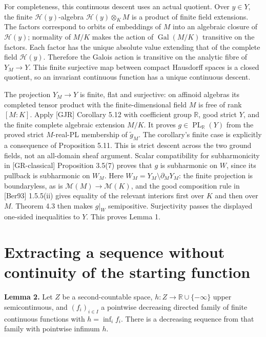 \documentclass[
  11pt,
]{article}
\begin{document}
For completeness, this continuous descent uses an actual quotient. Over
\(y\in Y\), the finite \(\mathcal H(y)\)-algebra
\(\mathcal H(y)\otimes_KM\) is a product of finite field extensions. The
factors correspond to orbits of embeddings of \(M\) into an algebraic
closure of \(\mathcal H(y)\); normality of \(M/K\) makes the action of
\(\operatorname{Gal}(M/K)\) transitive on the factors. Each factor has
the unique absolute value extending that of the complete field
\(\mathcal H(y)\). Therefore the Galois action is transitive on the
analytic fibre of \(Y_M\to Y\). This finite surjective map between
compact Hausdorff spaces is a closed quotient, so an invariant
continuous function has a unique continuous descent.

The projection \(Y_M\to Y\) is finite, flat and surjective: on affinoid
algebras its completed tensor product with the finite-dimensional field
\(M\) is free of rank \([M:K]\). Apply {[}GJR{]} Corollary 5.12 with
coefficient group \(\mathbb R\), good strict \(Y\), and the finite
complete algebraic extension \(M/K\). It proves
\(g\in\operatorname{PL}_{\mathbb R}(Y)\) from the proved strict
\(M\)-real-PL membership of \(\widetilde g_M\). The corollary's finite
case is explicitly a consequence of Proposition 5.11. This is strict
descent across the two ground fields, not an all-domain sheaf argument.
Scalar compatibility for subharmonicity in {[}GR-classical{]}
Proposition 3.5(7) proves that \(g\) is subharmonic on \(W\), since its
pullback is subharmonic on \(W_M\). Here
\(W_M=Y_M\setminus\partial_M Y_M\): the finite projection is
boundaryless, as is \(\mathcal M(M)\to\mathcal M(K)\), and the good
composition rule in {[}Ber93{]} 1.5.5(ii) gives equality of the relevant
interiors first over \(K\) and then over \(M\). Theorem 4.3 then makes
\(g|_W\) semipositive. Surjectivity passes the displayed one-sided
inequalities to \(Y\). This proves Lemma 1.

\section{Extracting a sequence without continuity of the starting
function}\label{extracting-a-sequence-without-continuity-of-the-starting-function}

\textbf{Lemma 2.} Let \(Z\) be a second-countable space,
\(h:Z\to\mathbb R\cup\{-\infty\}\) upper semicontinuous, and
\((f_i)_{i\in I}\) a pointwise decreasing directed family of finite
continuous functions with \(h=\inf_i f_i\). There is a decreasing
sequence from that family with pointwise infimum \(h\).
\end{document}
